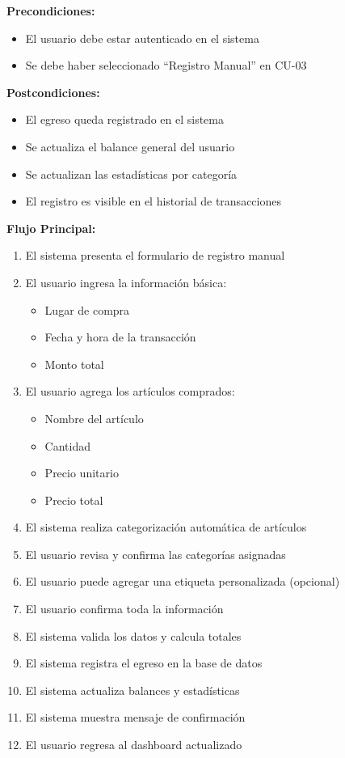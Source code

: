 \noindent\textbf{Precondiciones:}
\begin{itemize}
    \item El usuario debe estar autenticado en el sistema
    \item Se debe haber seleccionado ``Registro Manual'' en CU-03
\end{itemize}

\noindent\textbf{Postcondiciones:}
\begin{itemize}
    \item El egreso queda registrado en el sistema
    \item Se actualiza el balance general del usuario
    \item Se actualizan las estadísticas por categoría
    \item El registro es visible en el historial de transacciones
\end{itemize}

\noindent\textbf{Flujo Principal:}
\begin{enumerate}
    \item El sistema presenta el formulario de registro manual
    \item El usuario ingresa la información básica:
    \begin{itemize}
        \item Lugar de compra
        \item Fecha y hora de la transacción
        \item Monto total
    \end{itemize}
    \item El usuario agrega los artículos comprados:
    \begin{itemize}
        \item Nombre del artículo
        \item Cantidad
        \item Precio unitario
        \item Precio total
    \end{itemize}
    \item El sistema realiza categorización automática de artículos
    \item El usuario revisa y confirma las categorías asignadas
    \item El usuario puede agregar una etiqueta personalizada (opcional)
    \item El usuario confirma toda la información
    \item El sistema valida los datos y calcula totales
    \item El sistema registra el egreso en la base de datos
    \item El sistema actualiza balances y estadísticas
    \item El sistema muestra mensaje de confirmación
    \item El usuario regresa al dashboard actualizado
\end{enumerate}

